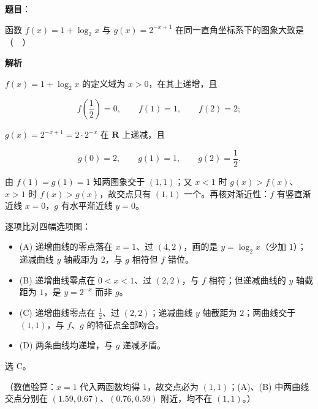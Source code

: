\begin{answer}

\textbf{题目}：

函数 $f(x)=1+\log_2 x$ 与 $g(x)=2^{-x+1}$ 在同一直角坐标系下的图象大致是（　）
\nopagebreak[4]
\begin{center}\end{center}
\nopagebreak[4]
\textbf{解析}

$f(x)=1+\log_2x$ 的定义域为 $x>0$，在其上递增，且

\nopagebreak[4]
\[f\left(\frac12\right)=0,\qquad f(1)=1,\qquad f(2)=2;\]

$g(x)=2^{-x+1}=2\cdot2^{-x}$ 在 $\mathbf R$ 上递减，且

\nopagebreak[4]
\[g(0)=2,\qquad g(1)=1,\qquad g(2)=\frac12 .\]

由 $f(1)=g(1)=1$ 知两图象交于 $(1,1)$；又 $x<1$ 时 $g(x)>f(x)$、$x>1$ 时 $f(x)>g(x)$，故交点只有 $(1,1)$ 一个。再核对渐近性：$f$ 有竖直渐近线 $x=0$，$g$ 有水平渐近线 $y=0$。

逐项比对四幅选项图：

\begin{itemize}
\item (A) 递增曲线的零点落在 $x=1$、过 $(4,2)$，画的是 $y=\log_2x$（少加 $1$）；递减曲线 $y$ 轴截距为 $2$，与 $g$ 相符但 $f$ 错位。
\item (B) 递增曲线零点在 $0<x<1$、过 $(2,2)$，与 $f$ 相符；但递减曲线的 $y$ 轴截距为 $1$，是 $y=2^{-x}$ 而非 $g$。
\item (C) 递增曲线零点在 $\frac12$、过 $(2,2)$；递减曲线 $y$ 轴截距为 $2$；两曲线交于 $(1,1)$，与 $f$、$g$ 的特征点全部吻合。
\item (D) 两条曲线均递增，与 $g$ 递减矛盾。
\end{itemize}

选 C。

（数值验算：$x=1$ 代入两函数均得 $1$，故交点必为 $(1,1)$；(A)、(B) 中两曲线交点分别在 $(1.59,0.67)$、$(0.76,0.59)$ 附近，均不在 $(1,1)$。）


\end{answer}
